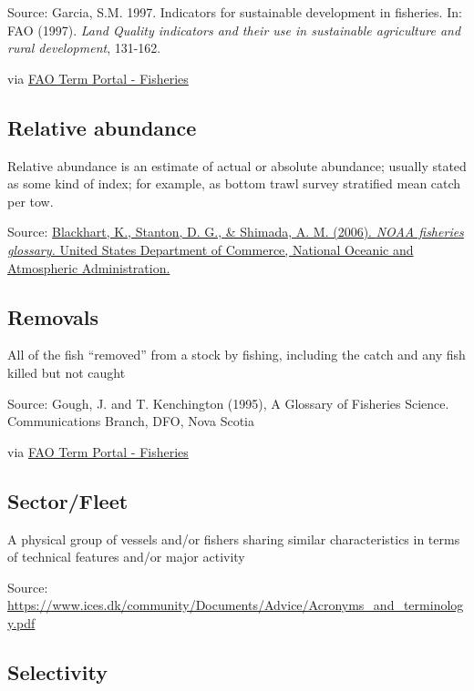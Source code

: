 \documentclass[
  11pt,
]{book}
\begin{document}
Source: Garcia, S.M. 1997. Indicators for sustainable development in fisheries. In: FAO (1997). \emph{Land Quality indicators and their use in sustainable agriculture and rural development}, 131-162.

via \href{http://www.fao.org/fishery/glossary/en}{FAO Term Portal - Fisheries}

\hypertarget{relative-abundance}{%
\subsection{Relative abundance}\label{relative-abundance}}

Relative abundance is an estimate of actual or absolute abundance; usually stated as some kind of index; for example, as bottom trawl survey stratiﬁed mean catch per tow.

Source: \href{https://repository.library.noaa.gov/view/noaa/12856}{Blackhart, K., Stanton, D. G., \& Shimada, A. M. (2006). \emph{NOAA fisheries glossary.} United States Department of Commerce, National Oceanic and Atmospheric Administration.}

\hypertarget{removals}{%
\subsection{Removals}\label{removals}}

All of the fish ``removed'' from a stock by fishing, including the catch and any fish killed but not caught

Source: Gough, J. and T. Kenchington (1995), A Glossary of Fisheries Science. Communications Branch, DFO, Nova Scotia

via \href{http://www.fao.org/fishery/glossary/en}{FAO Term Portal - Fisheries}

\hypertarget{sectorfleet}{%
\subsection{Sector/Fleet}\label{sectorfleet}}

A physical group of vessels and/or fishers sharing similar characteristics in terms of technical features and/or major activity

Source: \url{https://www.ices.dk/community/Documents/Advice/Acronyms_and_terminology.pdf}

\hypertarget{selectivity}{%
\subsection{Selectivity}\label{selectivity}}
\end{document}
